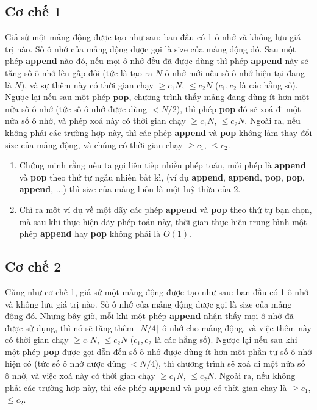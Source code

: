 \documentclass{article}
\begin{document}
\subsection{Cơ chế 1}
Giả sử một mảng động được tạo như sau: ban đầu có 1 ô nhớ và không lưu giá trị nào. Số ô nhớ của mảng động được gọi là size của mảng động đó. Sau một phép \textbf{append} nào đó, nếu mọi ô nhớ đều đã được dùng thì phép \textbf{append} này sẽ tăng số ô nhớ lên gấp đôi (tức là tạo ra $N$ ô nhớ mới nếu số ô nhớ hiện tại đang là $N$), và sự thêm này có thời gian chạy $\geq c_1 N$, $\leq c_2 N$ ($c_1, c_2$ là các hằng số). Ngược lại nếu sau một phép $\textbf{pop}$, chương trình thấy mảng đang dùng ít hơn một nửa số ô nhớ (tức số ô nhớ được dùng $< N/2$), thì phép \textbf{pop} đó sẽ xoá đi một nửa số ô nhớ, và phép xoá này có thời gian chạy $\geq c_1 N$, $\leq c_2 N$. Ngoài ra, nếu không phải các trường hợp này, thì các phép \textbf{append} và \textbf{pop} không làm thay đổi size của mảng động, và chúng có thời gian chạy $\geq c_1$, $\leq c_2$. 
\begin{em}
    \begin{enumerate}
        \item Chứng minh rằng nếu ta gọi liên tiếp nhiều phép toán, mỗi phép là \textbf{append} và \textbf{pop} theo thứ tự ngẫu nhiên bất kì, (ví dụ \textbf{append}, \textbf{append}, \textbf{pop}, \textbf{pop}, \textbf{append}, $\ldots$) thì size của mảng luôn là một luỹ thừa của 2.
        
        \item Chỉ ra một ví dụ về một dãy các phép \textbf{append} và \textbf{pop} theo thứ tự bạn chọn, mà sau khi thực hiện dãy phép toán này, thời gian thực hiện trung bình một phép \textbf{append} hay \textbf{pop} không phải là $O(1)$.
    \end{enumerate}
\end{em}

\subsection{Cơ chế 2}
Cũng như cơ chế 1, giả sử một mảng động được tạo như sau: ban đầu có 1 ô nhớ và không lưu giá trị nào. Số ô nhớ của mảng động được gọi là size của mảng động đó. Nhưng bây giờ, mỗi khi một phép \textbf{append} nhận thấy mọi ô nhớ đã được sử dụng, thì nó sẽ tăng thêm $\lceil N/4 \rceil$ ô nhớ cho mảng động, và việc thêm này có thời gian chạy $\geq c_1 N$, $\leq c_2 N$ ($c_1, c_2$ là các hằng số). Ngược lại nếu sau khi một phép \textbf{pop} được gọi dẫn đến số ô nhớ được dùng ít hơn một phần tư số ô nhớ hiện có (tức số ô nhớ được dùng $< N/4$), thì chương trình sẽ xoá đi một nửa số ô nhớ, và việc xoá này có thời gian chạy $\geq c_1 N$, $\leq c_2 N$. Ngoài ra, nếu không phải các trường hợp này, thì các phép \textbf{append} và \textbf{pop} có thời gian chạy là  $\geq c_1$, $\leq c_2$. \\
\end{document}
